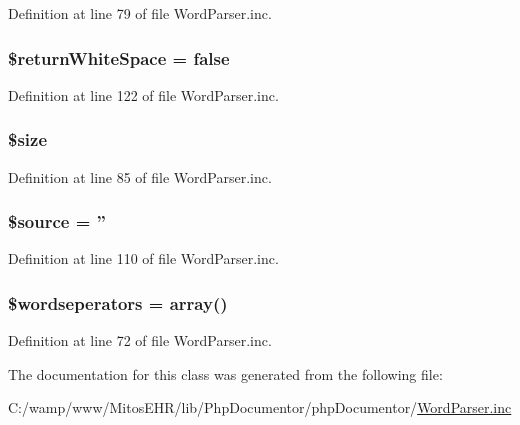 \-Definition at line 79 of file \-Word\-Parser.\-inc.

\hypertarget{class_word_parser_a8b16e505b93381daf0dbf7910b57db72}{
\subsubsection[{\$return\-White\-Space}]{\setlength{\rightskip}{0pt plus 5cm}\$return\-White\-Space = false}}\label{class_word_parser_a8b16e505b93381daf0dbf7910b57db72}


\-Definition at line 122 of file \-Word\-Parser.\-inc.

\hypertarget{class_word_parser_af594986e4618a8d6a5d7566617f583c6}{
\subsubsection[{\$size}]{\setlength{\rightskip}{0pt plus 5cm}\$size}}\label{class_word_parser_af594986e4618a8d6a5d7566617f583c6}


\-Definition at line 85 of file \-Word\-Parser.\-inc.

\hypertarget{class_word_parser_a99a2b085f0a29bd5d799fdcbb63d261b}{
\subsubsection[{\$source}]{\setlength{\rightskip}{0pt plus 5cm}\$source = ''}}\label{class_word_parser_a99a2b085f0a29bd5d799fdcbb63d261b}


\-Definition at line 110 of file \-Word\-Parser.\-inc.

\hypertarget{class_word_parser_a71e405c46bb9f4fc20444b174a15829b}{
\subsubsection[{\$wordseperators}]{\setlength{\rightskip}{0pt plus 5cm}\$wordseperators = array()}}\label{class_word_parser_a71e405c46bb9f4fc20444b174a15829b}


\-Definition at line 72 of file \-Word\-Parser.\-inc.



\-The documentation for this class was generated from the following file\-:\begin{DoxyCompactItemize}
\item 
\-C\-:/wamp/www/\-Mitos\-E\-H\-R/lib/\-Php\-Documentor/php\-Documentor/\hyperlink{_word_parser_8inc}{\-Word\-Parser.\-inc}\end{DoxyCompactItemize}
